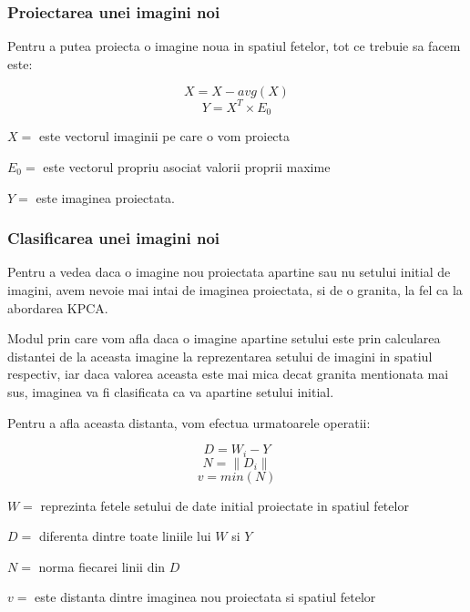 \documentclass[12pt,oneside]{article}
\begin{document}
\subsubsection{Proiectarea unei imagini noi}
Pentru a putea proiecta o imagine noua in spatiul fetelor, tot ce trebuie sa facem este: 

\begin{equation}
X=X-avg(X)
\end{equation}
\begin{equation}
Y=X^T \times E_0
\end{equation}

$X=$ este vectorul imaginii pe care o vom proiecta

$E_0=$ este vectorul propriu asociat valorii proprii maxime

$Y=$ este imaginea proiectata.

\subsubsection{Clasificarea unei imagini noi}

Pentru a vedea daca o imagine nou proiectata apartine sau nu setului initial de imagini, avem nevoie mai intai de imaginea proiectata, si de o granita, la fel ca la abordarea KPCA.

Modul prin care vom afla daca o imagine apartine setului este prin calcularea distantei de la aceasta imagine la reprezentarea setului de imagini in spatiul respectiv, iar daca valorea aceasta este mai mica decat granita mentionata mai sus, imaginea va fi clasificata ca va apartine setului initial.

Pentru a afla aceasta distanta, vom efectua urmatoarele operatii:

\begin{equation}
D=W_i-Y
\end{equation}
\begin{equation}
N=\| D_i  \|
\end{equation}
\begin{equation}
v=min(N)
\end{equation}

$W=$ reprezinta fetele setului de date initial proiectate in spatiul fetelor

$D=$ diferenta dintre toate liniile lui $W$ si $Y$

$N=$ norma fiecarei linii din $D$

$v=$ este distanta dintre imaginea nou proiectata si spatiul fetelor
\end{document}
